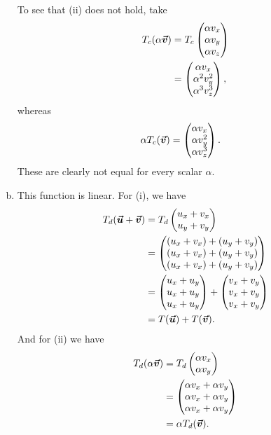 \documentclass[12pt]{article} %
\begin{document}
\begin{solution}
\begin{enumerate}[(a)]
    To see that (ii) does not hold, take
    \begin{align*}
        T_c(\alpha \boldsymbol{\vec{v}} ) &= T_c\begin{pmatrix} \alpha v_x \\ \alpha v_y \\ \alpha v_z \end{pmatrix}\\
        &= \begin{pmatrix} \alpha v_x \\ \alpha^2 v_y^2 \\ \alpha^3 v_z^3\end{pmatrix},
    \end{align*}
    whereas
    \begin{align*}
        \alpha T_c(\boldsymbol{\vec{v}})&= \begin{pmatrix} \alpha v_x \\ \alpha v_y^2 \\ \alpha v_z^3\end{pmatrix}.
    \end{align*}
    These are clearly not equal for every scalar $\alpha$.
    \item This function is linear. For (i), we have
    \begin{align*}
        T_d(\boldsymbol{\vec{u}} + \boldsymbol{\vec{v}}) &= T_d \begin{pmatrix} u_x + v_x \\ u_y + v_y \end{pmatrix}\\
        &=\begin{pmatrix} (u_x+v_x)+(u_y+v_y) \\ (u_x+v_x)+(u_y+v_y) \\ (u_x+v_x) + (u_y +v_y) \end{pmatrix}\\
        &= \begin{pmatrix} u_x + u_y \\ u_x + u_y \\ u_x + u_y \end{pmatrix} + \begin{pmatrix} v_x + v_y \\ v_x + v_y \\ v_x + v_y \end{pmatrix}\\
        &= T(\boldsymbol{\vec{u}}) + T(\boldsymbol{\vec{v}}).
    \end{align*}
    And for (ii) we have
    \begin{align*}
        T_d(\alpha \boldsymbol{\vec{v}}) &= T_d \begin{pmatrix} \alpha v_x \\ \alpha v_y \end{pmatrix}\\
        &= \begin{pmatrix} \alpha v_x + \alpha v_y \\ \alpha v_x + \alpha v_y \\ \alpha v_x + \alpha v_y \end{pmatrix}\\
        &= \alpha T_d(\boldsymbol{\vec{v}}).
    \end{align*}
\end{enumerate}
\end{solution}
\end{document}

